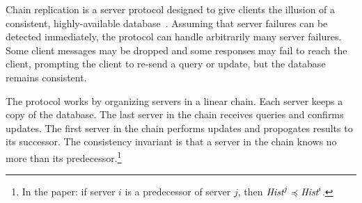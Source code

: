 \documentclass{article}
\begin{document}

Chain replication is a server protocol designed to give clients the illusion of a consistent, highly-available database~\cite{rs-chain}.
Assuming that server failures can be detected immediately, the protocol can handle arbitrarily many server failures.
Some client messages may be dropped and some responses may fail to reach the client, prompting the client to re-send a query or update, but the database remains consistent.

The protocol works by organizing servers in a linear chain.
Each server keeps a copy of the database.
The last server in the chain receives queries and confirms updates.
The first server in the chain performs updates and propogates results to its successor.
The consistency invariant is that a server in the chain knows no more than its predecessor.\footnote{In the paper: if server $i$ is a predecessor of server $j$, then $\emph{Hist}^j \preccurlyeq \emph{Hist}^i$.}


\footnotesize


\end{document}
